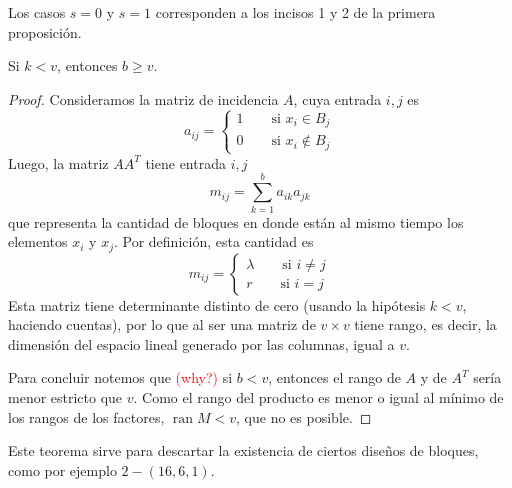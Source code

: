 \documentclass[spanish]{book}
\theoremstyle{definition}
\DeclareMathOperator{\ran}{ran}
\begin{document}
Los casos $s=0$ y $s=1$ corresponden a los incisos 1 y 2 de la primera proposición.
\begin{teo}
	Si $k<v$, entonces $b\geq v$.
\end{teo}
\begin{proof}
	Consideramos la matriz de incidencia $A$, cuya entrada $i,j$ es
	\[a_{ij}=\begin{cases}
		1\qquad\text{si }x_i\in B_j\\
		0\qquad\text{si }x_i\notin B_j
	\end{cases}\]
	Luego, la matriz $AA^T$ tiene entrada $i,j$
	\[m_{ij}=\sum_{k=1}^ba_{ik}a_{jk}\]
	que representa la cantidad de bloques en donde están al mismo tiempo los elementos $x_i$ y $x_j$. Por definición, esta cantidad es
	\[m_{ij}=\begin{cases}
		\lambda\qquad\text{si }i\neq j\\
		r\qquad\text{si }i=j
	\end{cases}\]
	Esta matriz tiene determinante distinto de cero (usando la hipótesis $k<v$, haciendo cuentas), por lo que al ser una matriz de $v\times v$ tiene rango, es decir, la dimensión del espacio lineal generado por las columnas, igual a $v$.
	
	Para concluir notemos que \textcolor{red}{(why?)} si $b<v$, entonces el rango de $A$ y de $A^T$ sería menor estricto que $v$. Como el rango del producto es menor o igual al mínimo de los rangos de los factores, $\ran M<v$, que no es posible.
\end{proof}
Este teorema sirve para descartar la existencia de ciertos diseños de bloques, como por ejemplo $2-(16,6,1)$.
\end{document}

